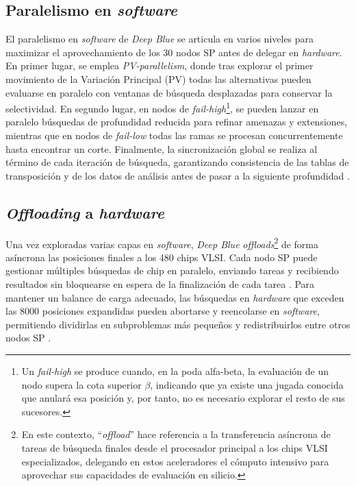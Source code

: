 \documentclass[a4paper, 12pt]{article}
\begin{document}
\subsection{Paralelismo en \emph{software}}

El paralelismo en \emph{software} de \textit{Deep Blue} se articula en 
varios niveles para maximizar el aprovechamiento de los 30 
nodos SP antes de delegar en \emph{hardware}. En primer lugar, se 
emplea \emph{PV-parallelism}, donde tras explorar el primer 
movimiento de la Variación Principal (PV) todas las alternativas 
pueden evaluarse en paralelo con ventanas de búsqueda 
desplazadas para conservar la selectividad. 
En segundo lugar, en nodos de \emph{fail-high}\footnote{Un 
\emph{fail-high} se produce cuando, en la poda 
alfa-beta, la evaluación de un nodo supera la cota superior 
\(\beta\), indicando que ya existe una jugada conocida que 
anulará esa posición y, por tanto, no es necesario explorar el 
resto de sus sucesores.}, se 
pueden lanzar en paralelo búsquedas de profundidad reducida 
para refinar amenazas y extensiones, mientras que en nodos de 
\emph{fail-low} todas las ramas se procesan 
concurrentemente hasta encontrar un corte. 
Finalmente, la sincronización global se realiza al término de 
cada iteración de búsqueda, garantizando consistencia de las 
tablas de transposición y de los datos de análisis antes de 
pasar a la siguiente profundidad \cite{campbell2002deep}.

\subsection{\emph{Offloading} a \emph{hardware}}

Una vez exploradas varias capas en \emph{software}, \textit{Deep Blue} 
\emph{offloads}\footnote{En este contexto, “\emph{offload}” hace 
referencia a la transferencia asíncrona de tareas de búsqueda 
finales desde el procesador principal a los chips VLSI 
especializados, delegando en estos aceleradores el cómputo 
intensivo para aprovechar sus capacidades de evaluación en 
silicio.} 
de forma asíncrona las posiciones finales a los 
480 chips VLSI. Cada nodo SP puede gestionar múltiples búsquedas 
de chip en paralelo, enviando tareas y recibiendo resultados 
sin bloquearse en espera de la finalización de cada tarea 
\cite{campbell2002deep}. Para mantener un balance de carga 
adecuado, las búsquedas en \emph{hardware} que exceden las 8000 
posiciones expandidas pueden abortarse y reencolarse en 
\emph{software}, permitiendo dividirlas en subproblemas más pequeños y 
redistribuirlos entre otros nodos SP \cite{campbell2002deep}.
\end{document}
